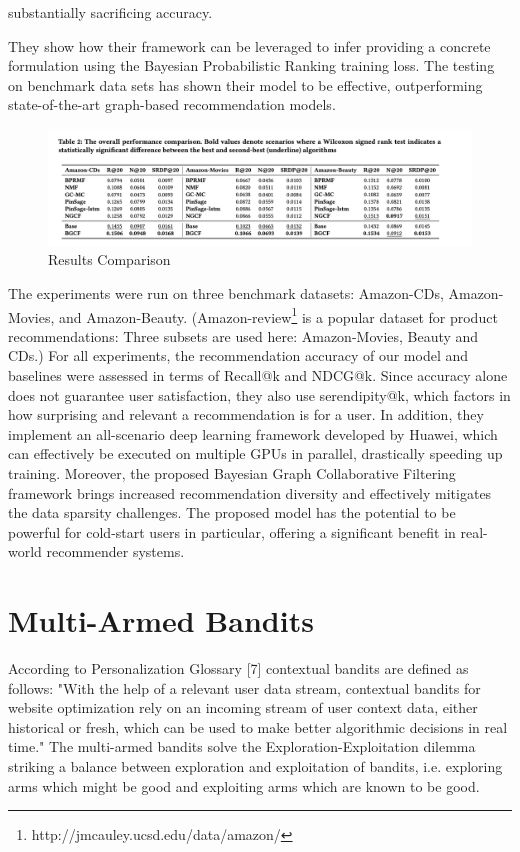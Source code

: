substantially sacrificing accuracy.

They show how their framework can be leveraged to infer providing a concrete formulation using the Bayesian Probabilistic Ranking training loss. The testing on benchmark data sets has shown their model to be effective, outperforming state-of-the-art graph-based recommendation models. 

\begin{figure}[hh!]
    \centering
    \includegraphics[width=125mm]{BGCF_results_comparison.png}
    \caption{Results Comparison
    \label{overflow}}
\end{figure}

The experiments were run on three benchmark datasets: Amazon-CDs, Amazon-Movies, and Amazon-Beauty. (Amazon-review\footnote{ http://jmcauley.ucsd.edu/data/amazon/} is a popular dataset for product recommendations: Three subsets are used here: Amazon-Movies, Beauty and CDs.) For all experiments, the recommendation accuracy of our model and baselines were assessed in terms of Recall@k and NDCG@k. Since accuracy alone does not guarantee user satisfaction, they also use serendipity@k, which factors in how surprising and relevant a recommendation is for a user.  In addition, they implement an all-scenario deep learning framework developed by Huawei, which can effectively be executed on multiple GPUs in parallel, drastically speeding up training.  Moreover, the proposed Bayesian Graph Collaborative Filtering framework brings increased recommendation diversity and effectively mitigates the data sparsity challenges. The proposed model has the potential to be powerful for cold-start users in particular, offering a significant benefit in real-world recommender systems. 

\chapter{Multi-Armed Bandits}
According to Personalization Glossary [7] contextual bandits are defined as follows: "With the help of a relevant user data stream, contextual bandits for website optimization rely on an incoming stream of user context data, either historical or fresh, which can be used to make better algorithmic decisions in real time."
The multi-armed bandits solve the Exploration-Exploitation dilemma striking a balance between exploration and exploitation of bandits, i.e. exploring arms which might be good and exploiting arms which are known to be good.

